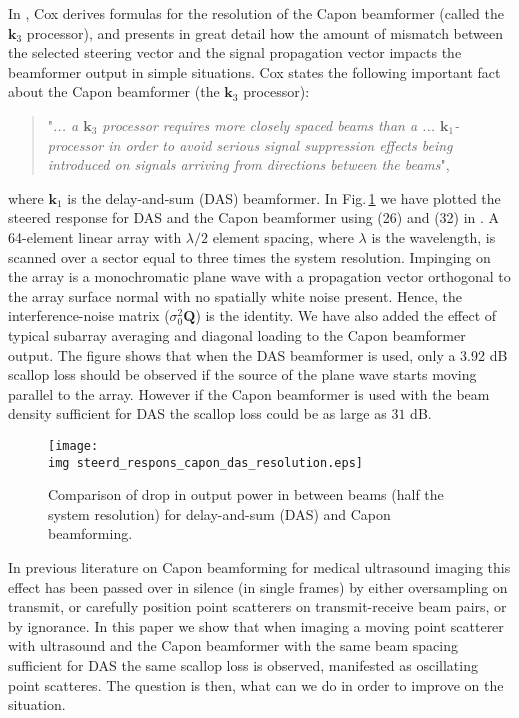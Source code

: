 \documentclass[journal]{IEEEtran}
\newcommand{\mat}[1]{\mathbf{#1}}
\renewcommand{\vec}[1]{\mathbf{#1}}
\newcommand{\img}{img/}
\begin{document}
In \cite{Cox1973}, Cox derives formulas for the resolution of the Capon beamformer (called the $\vec{k}_3$ processor), and presents in great detail how the amount of mismatch between the selected steering vector and the signal propagation vector impacts the beamformer output in simple situations. Cox states the following important fact about the Capon beamformer (the $\vec{k}_3$ processor): 
\begin{quote}
"\textit{... a $\vec{k}_3$ processor requires more closely spaced beams than a ... $\vec{k}_1$-processor in order to avoid serious signal suppression effects being introduced on signals arriving from directions between the beams}", 
\end{quote}
where $\vec{k}_1$ is the delay-and-sum (DAS) beamformer. In Fig.\,\ref{fig:das_capon_beams} we have plotted the steered response for DAS and the Capon beamformer using (26) and (32) in \cite{Cox1973}. A 64-element linear array with $\lambda/2$ element spacing, where $\lambda$ is the wavelength, is scanned over a sector equal to three times the system resolution. Impinging on the array is a monochromatic plane wave with a propagation vector orthogonal to the array surface normal with no spatially white noise present. Hence, the interference-noise matrix ($\sigma_0^2\mat{Q}$) is the identity. We have also added the effect of typical subarray averaging and diagonal loading \cite{Asen} to the Capon beamformer output. The figure shows that when the DAS beamformer is used, only a 3.92 dB scallop loss \cite{Harris1978} should be observed if the source of the plane wave starts moving parallel to the array. However if the Capon beamformer is used with the beam density sufficient for DAS the scallop loss could be as large as $31$ dB. 

\begin{figure}[!t]
\centerline{
\texttt{[image: \\img steerd\_respons\_capon\_das\_resolution.eps]}
}
\caption{Comparison of drop in output power in between beams (half the system resolution) for delay-and-sum (DAS) and Capon beamforming.}
\label{fig:das_capon_beams}
\end{figure}

In previous literature on Capon beamforming for medical ultrasound imaging this effect has been passed over in silence (in single frames) by either oversampling on transmit, or carefully position point scatterers on transmit-receive beam pairs, or by ignorance. In this paper we show that when imaging a moving point scatterer with ultrasound and the Capon beamformer with the same beam spacing sufficient for DAS the same scallop loss is observed, manifested as oscillating point scatteres. The question is then, what can we do in order to improve on the situation.
\end{document}
